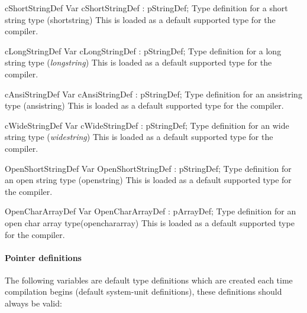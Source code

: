 \documentclass [a4paper,12pt]{article}
\begin{document}
\begin{variable}{cShortStringDef}
\Declaration
Var cShortStringDef : pStringDef;
\Description
Type definition for a short string type (\textsf{shortstring})
\Notes
This is loaded as a default supported type for the compiler.
\end{variable}

\begin{variable}{cLongStringDef}
\Declaration
Var cLongStringDef : pStringDef;
\Description
Type definition for a long string type (\textsf{\textit{longstring}})
\Notes
This is loaded as a default supported type for the compiler.
\end{variable}

\begin{variable}{cAnsiStringDef}
\Declaration
Var cAnsiStringDef : pStringDef;
\Description
Type definition for an ansistring type (\textsf{ansistring})
\Notes
This is loaded as a default supported type for the compiler.
\end{variable}

\begin{variable}{cWideStringDef}
\Declaration
Var cWideStringDef : pStringDef;
\Description
Type definition for an wide string type (\textsf{\textit{widestring}})
\Notes
This is loaded as a default supported type for the compiler.
\end{variable}

\begin{variable}{OpenShortStringDef}
\Declaration
Var OpenShortStringDef : pStringDef;
\Description
Type definition for an open string type (\textsf{openstring})
\Notes
This is loaded as a default supported type for the compiler.
\end{variable}

\begin{variable}{OpenCharArrayDef}
\Declaration
Var OpenCharArrayDef : pArrayDef;
\Description
Type definition for an open char array type(\textsf{openchararray})
\Notes
This is loaded as a default supported type for the compiler.
\end{variable}

\clearpage

\paragraph{Pointer definitions}

The following variables are default type definitions which are created each
time compilation begins (default system-unit definitions), these definitions
should always be valid:
\end{document}
